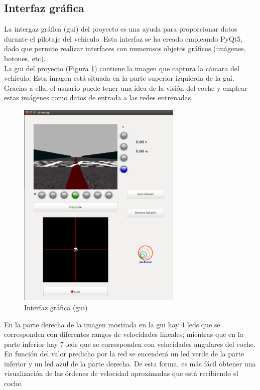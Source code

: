 \subsection{Interfaz gráfica}

La intergaz gráfica (\acrshort{gui}) del proyecto es una ayuda para proporcionar datos durante el pilotaje del vehículo. Esta interfaz se ha creado empleando PyQt5, dado que permite realizar interfaces con numerosos objetos gráficos (imágenes, botones, etc).\\

La \acrshort{gui} del proyecto (Figura \ref{fig.gui}) contiene la imagen que captura la cámara del vehículo. Esta imagen está situada en la parte superior izquierda de la \acrshort{gui}. Gracias a ella, el usuario puede tener una idea de la visión del coche y emplear estas imágenes como datos de entrada a las redes entrenadas.\\

\begin{figure}
  \begin{center}
    \includegraphics[width=0.7\textwidth]{figures/Infraestructura/gui.png}
		\caption{Interfaz gráfica (\acrshort{gui})}
		\label{fig.gui}
		\end{center}
\end{figure}

En la parte derecha de la imagen mostrada en la \acrshort{gui} hay 4 leds que se corresponden con diferentes rangos de velocidades lineales; mientras que en la parte inferior hay 7 leds que se corresponden con velocidades angulares del coche. En función del valor predicho por la red se encenderá un led verde de la parte inferior y un led azul de la parte derecha. De esta forma, es más fácil obtener una visualización de las órdenes de velocidad aproximadas que está recibiendo el coche. \\

